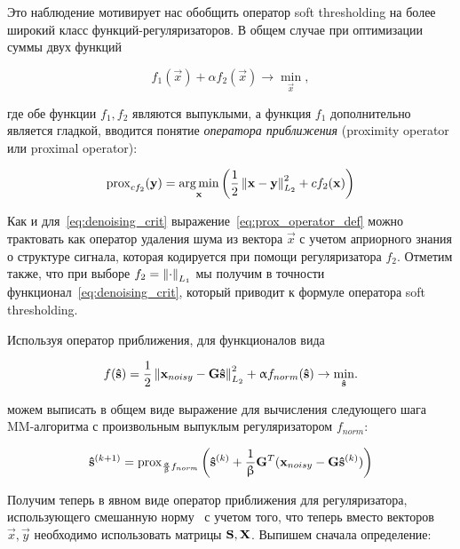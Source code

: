Это наблюдение мотивирует нас обобщить оператор soft thresholding на
более широкий класс функций-регуляризаторов. В общем случае
при оптимизации суммы двух функций

\begin{equation}
    f_1(\vec{x}) + \alpha f_2(\vec{x}) \rightarrow \underset{\vec{x}}\min,
\end{equation}

где обе функции $f_1, f_2$ являются выпуклыми, а функция $f_1$ дополнительно
является гладкой, вводится понятие \emph{оператора приближения} (proximity
operator или proximal operator):

\begin{equation}
    \operatorname{prox}_{c f_2}(\mathbf{y}) = \operatorname*{arg\,min}_{\mathbf{x}}\left(\frac{1}{2}\left\lVert\mathbf{x - y}\right\rVert^2_{L_2} + c f_2(\mathbf{x})\right)
    \label{eq:prox_operator_def}
\end{equation}

Как и для~\ref{eq:denoising_crit} выражение~\ref{eq:prox_operator_def} можно
трактовать как оператор удаления шума из вектора $\vec{x}$ с учетом априорного
знания о структуре сигнала, которая кодируется при помощи регуляризатора $f_2$.
Отметим также, что при выборе $f_2 = \left\lVert\cdot\right\rVert_{L_1}$ мы получим в точности
функционал~\ref{eq:denoising_crit}, который приводит к формуле оператора
soft thresholding.

Используя оператор приближения, для функционалов вида

\begin{equation}
    f(\mathbf{\hat{s}}) = \frac{1}{2}\left\lVert\mathbf{x}_{noisy} - \mathbf{G}\mathbf{\hat{s}}\right\rVert^2_{L_2} + \upalpha f_{norm}(\mathbf{\hat{s}})
    \rightarrow \underset{\mathbf{\hat{s}}}{\min}.
    \label{eq:abstract_reg_func_crit}
\end{equation}

можем выписать в общем виде выражение для вычисления следующего шага
MM-алгоритма с произвольным выпуклым регуляризатором $f_{norm}$:

\begin{equation}
    \mathbf{\hat{s}}^{(k+1)} =
    \operatorname{prox}_{\frac{\upalpha}{\upbeta} f_{norm}}\left(\mathbf{\hat{s}}^{(k)} + \frac{1}{\upbeta} \mathbf{G}^T(\mathbf{x}_{noisy} - \mathbf{G} \mathbf{\hat{s}}^{(k)})\right)
    \label{eq:mm_next_iter_prox}
\end{equation}

Получим теперь в явном виде оператор приближения для регуляризатора,
использующего смешанную норму~\cite{gramfort_2012} с учетом того, что теперь
вместо векторов $\vec{x}, \vec{y}$ необходимо использовать матрицы $\mathbf{S},
\mathbf{X}$. Выпишем сначала определение:

